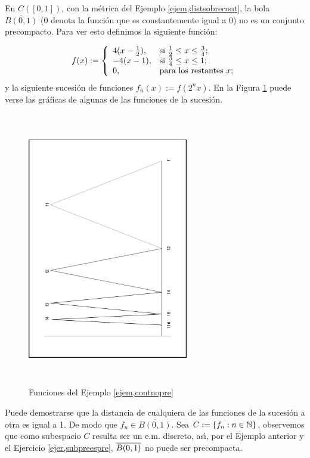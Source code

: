 \begin{ejemplo}\label{ejem,contnopre} En $C([0,1])$, con la m\'etrica del Ejemplo
\vref{ejem,distsobrecont}, la bola $\overline{B(0,1)}$ (0 denota
la funci\'on que es constantemente igual a 0) no es un conjunto
precompacto. Para ver esto definimos la siguiente funci\'on:

\[
    f(x):=\left\{%
\begin{array}{ll}
    4(x-\frac12), & \hbox{si $\frac12\leq x\leq \frac34$;} \\
    -4(x-1), & \hbox{si $\frac34\leq x\leq 1$;} \\
    0, & \hbox{para los restantes $x$;} \\
\end{array}
\right.
\]
y la siguiente sucesi\'on de funciones $f_n(x):=f(2^nx)$. En la
Figura \ref{fig,contnopre} puede verse las gr\'aficas de algunas
de las funciones de la sucesi\'on.

\begin{figure}[h]
\begin{center}
    \includegraphics[height=12cm,
    width=7cm,angle=-90]{noprecom.eps}
    \caption{Funciones del Ejemplo
    \ref{ejem,contnopre}}\label{fig,contnopre}
\end{center}
\end{figure}

Puede demostrarse que la distancia de cualquiera de las funciones
de la sucesi\'on a otra es igual a 1. De modo que $f_n\in
\overline{B(0,1)}$. Sea $C:=\{f_n:n\in\nn\}$, observemos que como
subespacio $C$ resulta ser un e.m. discreto, as\'{\i}, por el
Ejemplo anterior y el Ejercicio \vref{ejer,subpreespre},
$\C{B(0,1)}$ no puede ser precompacta.
\end{ejemplo}

